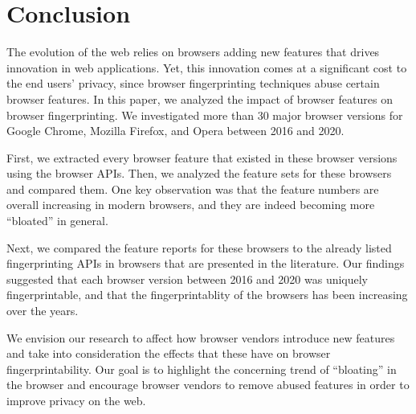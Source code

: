 \section{Conclusion}
\label{sec:conclusion}

The evolution of the web relies on browsers adding new features that drives innovation in web applications. Yet, this innovation comes at a significant cost to the end users' privacy, since browser fingerprinting techniques abuse certain browser features. In this paper, we analyzed the
impact of browser features on browser fingerprinting. We
investigated more than 30 major browser versions for Google
Chrome, Mozilla Firefox, and Opera between 2016 and 2020.

First, we extracted every browser feature that existed in these
browser versions using the browser APIs. Then, we analyzed the feature
sets for these browsers and compared them. One key observation was
that the feature numbers are overall increasing in modern browsers,
and they are indeed becoming more ``bloated'' in general.

Next, we compared the feature reports for these browsers to the
already listed fingerprinting APIs in browsers that are presented in the
literature. Our findings suggested that each browser version between 2016
and 2020 was uniquely fingerprintable, and that the fingerprintablity
of the browsers has been increasing over the years.

We envision our research to affect how browser vendors introduce new features and take into consideration the effects that these have on browser fingerprintability. Our goal is to highlight the concerning trend of ``bloating'' in the browser and encourage browser vendors to remove abused features in order to improve privacy on the web.

